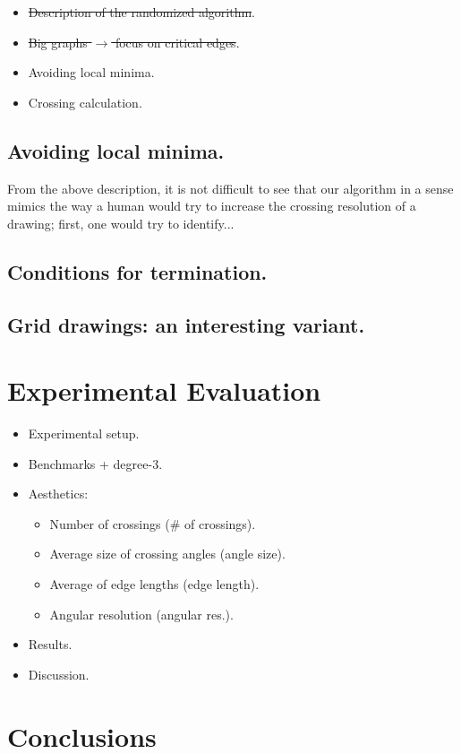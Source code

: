 \documentclass{llncs}
\begin{document}
\begin{itemize}
\item \st{Description of the randomized algorithm}.
\item \st{Big graphs $\rightarrow$ focus on critical edges}.
\item Avoiding local minima.
\item Crossing calculation. 
\end{itemize}

\subsection{Avoiding local minima.}
\label{ssec:minima}

From the above description, it is not difficult to see that our algorithm in a sense mimics the way a human would try to increase the crossing resolution of a drawing; first, one would try to identify...

\subsection{Conditions for termination.}
\label{ssec:termination}

\subsection{Grid drawings: an interesting variant.}
\label{ssec:grid}


\section{Experimental Evaluation}
\label{sec:experiments}

\begin{itemize}
\item Experimental setup.
\item Benchmarks + degree-3.
\item Aesthetics:

\begin{itemize}
\item Number of crossings (\# of crossings).
\item Average size of crossing angles (angle size).
\item Average of edge lengths (edge length).
\item Angular resolution (angular res.).
\end{itemize}

\item Results.
\item Discussion.
\end{itemize}

\section{Conclusions}
\label{sec:conclusions}



\end{document}
